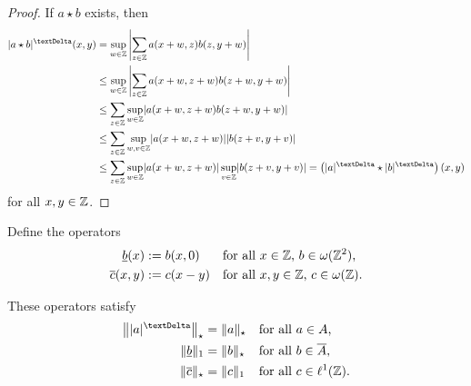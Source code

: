 \begin{proof}
    If $ a \star b $ exists, then
    \begin{align*}
        \absDi{ a \star b }( x, y )
        &=
        \sup_{w\in\nrZ} \Abs{ \sum_{z\in\nrZ} a(x+w,z)b(z,y+w) }
        \\
        &\leq
        \sup_{w\in\nrZ} \Abs{ \sum_{z\in\nrZ} a(x+w,z+w)b(z+w,y+w) }
        \\
        &\leq
        \sum_{z\in\nrZ} \sup_{w\in\nrZ} \abs{ a(x+w,z+w)b(z+w,y+w) }
        \\
        &\leq
        \sum_{z\in\nrZ} \sup_{w,v\in\nrZ}\abs{ a(x+w,z+w) }\abs{ b(z+v,y+v) }
        \\
        &\leq
        \sum_{z\in\nrZ} \sup_{w\in\nrZ}\abs{ a(x+w,z+w) }
        \sup_{v\in\nrZ}\abs{ b(z+v,y+v) }
        =
        \left( \absDi{ a } \star \absDi{ b } \right)( x, y )
    \end{align*}
    for all $ x, y \in \mathbb{ Z } $.
\end{proof}

Define the operators
\begin{subequations}
    \begin{align}
        \underline{b}( x )
        &:=
        b( x, 0 )
        &&\text{for all $ x \in \mathbb{ Z } $, $ b \in \omega( \mathbb{ Z }^2 ) $,}
        \\
        \overline{c}( x, y )
        &:=
        c( x - y )
        &&\text{for all $ x, y \in \mathbb{ Z } $, $ c \in \omega( \mathbb{ Z } ) $.}
    \end{align}
\end{subequations}

\begin{lemma}
    These operators satisfy
    \begin{subequations}
        \begin{align}
            \Norm{ \absDi{ a } }_\star
            &=
            \norm{ a }_\star
            &&\text{for all $ a \in A $,}
            \\
            \norm{ \underline{b} }_1
            &=
            \norm{ b }_\star
            &&\text{for all $ b \in \overline{A} $,}
            \\
            \norm{ \overline{c} }_\star
            &=
            \norm{ c }_1
            &&\text{for all $ c \in \fsSum{1}(\nrZ) $.}
        \end{align}
    \end{subequations}
\end{lemma}

